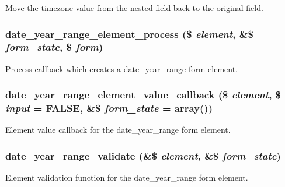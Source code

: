 Move the timezone value from the nested field back to the original field. \hypertarget{date__api__elements_8inc_a543c5f0338ae1931c7a626a896f6f2c0}{
\subsubsection[{date\_\-year\_\-range\_\-element\_\-process}]{\setlength{\rightskip}{0pt plus 5cm}date\_\-year\_\-range\_\-element\_\-process (\$ {\em element}, \/  \&\$ {\em form\_\-state}, \/  \$ {\em form})}}
\label{date__api__elements_8inc_a543c5f0338ae1931c7a626a896f6f2c0}
Process callback which creates a date\_\-year\_\-range form element. \hypertarget{date__api__elements_8inc_a5d5c87e2c1dd81edff2eabdfb11224b7}{
\subsubsection[{date\_\-year\_\-range\_\-element\_\-value\_\-callback}]{\setlength{\rightskip}{0pt plus 5cm}date\_\-year\_\-range\_\-element\_\-value\_\-callback (\$ {\em element}, \/  \$ {\em input} = {\ttfamily FALSE}, \/  \&\$ {\em form\_\-state} = {\ttfamily array()})}}
\label{date__api__elements_8inc_a5d5c87e2c1dd81edff2eabdfb11224b7}
Element value callback for the date\_\-year\_\-range form element. \hypertarget{date__api__elements_8inc_a2c68320d30ee6a4f5c33c623f667c305}{
\subsubsection[{date\_\-year\_\-range\_\-validate}]{\setlength{\rightskip}{0pt plus 5cm}date\_\-year\_\-range\_\-validate (\&\$ {\em element}, \/  \&\$ {\em form\_\-state})}}
\label{date__api__elements_8inc_a2c68320d30ee6a4f5c33c623f667c305}
Element validation function for the date\_\-year\_\-range form element. 